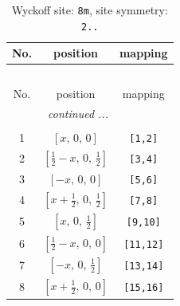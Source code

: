 \documentclass[fleqn,8pt]{jsarticle}
\begin{document}
\begin{longtable}{ccc}
\caption{Wyckoff site: {\tt 8m}, site symmetry: {\tt 2..}}
 \\
 \hline \hline
No. & position & mapping \\ \hline \endfirsthead

\multicolumn{2}{l}{\tablename\ \thetable{}} \\
 \hline \hline
No. & position & mapping \\ \hline \endhead

 \hline \hline
\multicolumn{2}{r}{\footnotesize\it continued ...} \\ \endfoot

 \hline \hline
\multicolumn{2}{r}{} \\ \endlastfoot

1 & $\left[ x,\, 0,\, 0 \right]$ & {\tt [1,2]} \\ \hline
2 & $\left[ \frac{1}{2} - x,\, 0,\, \frac{1}{2} \right]$ & {\tt [3,4]} \\ \hline
3 & $\left[ - x,\, 0,\, 0 \right]$ & {\tt [5,6]} \\ \hline
4 & $\left[ x + \frac{1}{2},\, 0,\, \frac{1}{2} \right]$ & {\tt [7,8]} \\ \hline
5 & $\left[ x,\, 0,\, \frac{1}{2} \right]$ & {\tt [9,10]} \\ \hline
6 & $\left[ \frac{1}{2} - x,\, 0,\, 0 \right]$ & {\tt [11,12]} \\ \hline
7 & $\left[ - x,\, 0,\, \frac{1}{2} \right]$ & {\tt [13,14]} \\ \hline
8 & $\left[ x + \frac{1}{2},\, 0,\, 0 \right]$ & {\tt [15,16]} \\
\end{longtable}
\renewcommand{\arraystretch}{1.2}
\end{document}
